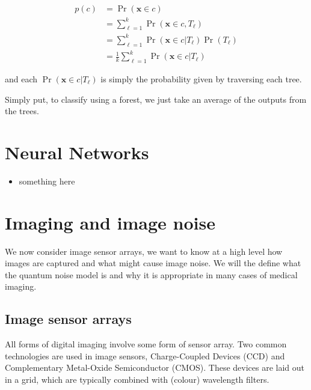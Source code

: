 \documentclass[12pt,twoside,notitlepage]{report}
\newcommand{\vc}[1]{\mathbf{#1}}
\begin{document}
            \begin{align}
                p(c) & = \Pr(\vc{x} \in c) \\
                    & = \sum_{\ell=1}^k \Pr(\vc{x} \in c, T_\ell) \\
                    & = \sum_{\ell=1}^k \Pr(\vc{x} \in c | T_\ell) \Pr(T_\ell) \\
                    & = \frac{1}{k} \sum_{\ell=1}^k \Pr(\vc{x} \in c | T_\ell)
            \end{align}

            and each $\Pr(\vc{x} \in c | T_\ell)$ is simply the probability given by traversing each tree. \cite{criminisi2013decision}

            Simply put, to classify using a forest, we just take an average of the outputs from the trees. 





    \section{Neural Networks}
        \begin{itemize}
            \item something here
        \end{itemize}



    \section{Imaging and image noise} 
        We now consider image sensor arrays, we want to know at a high level how images are captured and what might 
        cause image noise. We will the define what the quantum noise model is and why it is appropriate in many 
        cases of medical imaging. 

        \subsection{Image sensor arrays}
            All forms of digital imaging involve some form of sensor array. Two common technologies are used in image 
            sensors, Charge-Coupled Devices (CCD) and Complementary Metal-Oxide Semiconductor (CMOS). These devices are 
            laid out in a grid, which are typically combined with (colour) wavelength filters. 
\end{document}
